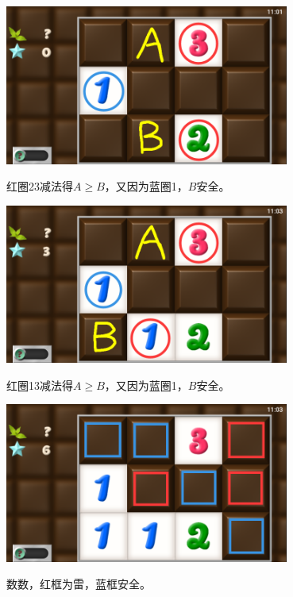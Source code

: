 \subsection{} %
\begin{center}
    \includegraphics[width=0.7\textwidth]{puzzle/14-1.png}
\end{center}
红圈23减法得$A\ge B$，又因为蓝圈1，$B$安全。
\begin{center}
    \includegraphics[width=0.7\textwidth]{puzzle/14-2.png}
\end{center}
红圈13减法得$A\ge B$，又因为蓝圈1，$B$安全。
\begin{center}
    \includegraphics[width=0.7\textwidth]{puzzle/14-3.png}
\end{center}
数数，红框为雷，蓝框安全。

